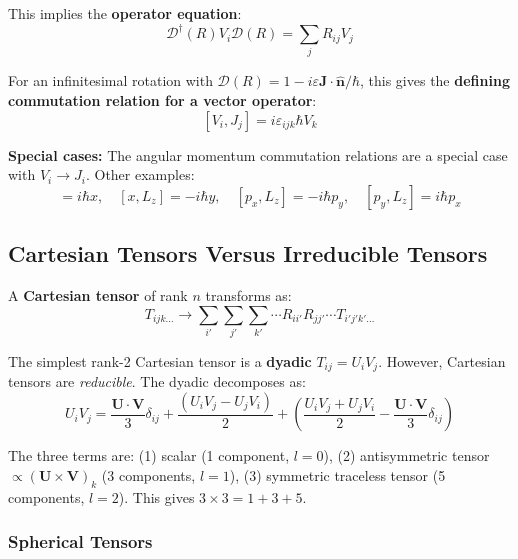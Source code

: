 \documentclass[11pt,a4paper]{article}
\begin{document}
This implies the \textbf{operator equation}:
\begin{equation}
\mathscr{D}^\dagger(R)V_i\mathscr{D}(R) = \sum_j R_{ij}V_j
\tag{3.446}
\end{equation}

For an infinitesimal rotation with $\mathscr{D}(R) = 1 - i\varepsilon\mathbf{J}\cdot\hat{\mathbf{n}}/\hbar$, this gives the \textbf{defining commutation relation for a vector operator}:
\begin{equation}
\boxed{[V_i, J_j] = i\varepsilon_{ijk}\hbar V_k}
\tag{3.451}
\end{equation}

\textbf{Special cases:} The angular momentum commutation relations are a special case with $V_i \to J_i$. Other examples:
\begin{equation}
[y, L_z] = i\hbar x, \quad [x, L_z] = -i\hbar y, \quad [p_x, L_z] = -i\hbar p_y, \quad [p_y, L_z] = i\hbar p_x
\tag{3.451'}
\end{equation}

\subsection{Cartesian Tensors Versus Irreducible Tensors}

A \textbf{Cartesian tensor} of rank $n$ transforms as:
\begin{equation}
T_{ijk\ldots} \to \sum_{i'}\sum_{j'}\sum_{k'}\cdots R_{ii'}R_{jj'}\cdots T_{i'j'k'\ldots}
\tag{3.454}
\end{equation}

The simplest rank-2 Cartesian tensor is a \textbf{dyadic} $T_{ij} = U_i V_j$. However, Cartesian tensors are \textit{reducible}. The dyadic decomposes as:
\begin{equation}
U_i V_j = \frac{\mathbf{U}\cdot\mathbf{V}}{3}\delta_{ij} + \frac{(U_i V_j - U_j V_i)}{2} + \left(\frac{U_i V_j + U_j V_i}{2} - \frac{\mathbf{U}\cdot\mathbf{V}}{3}\delta_{ij}\right)
\tag{3.456}
\end{equation}

The three terms are: (1) scalar (1 component, $l=0$), (2) antisymmetric tensor $\propto (\mathbf{U}\times\mathbf{V})_k$ (3 components, $l=1$), (3) symmetric traceless tensor (5 components, $l=2$). This gives $3 \times 3 = 1 + 3 + 5$.

\subsubsection{Spherical Tensors}
\end{document}
